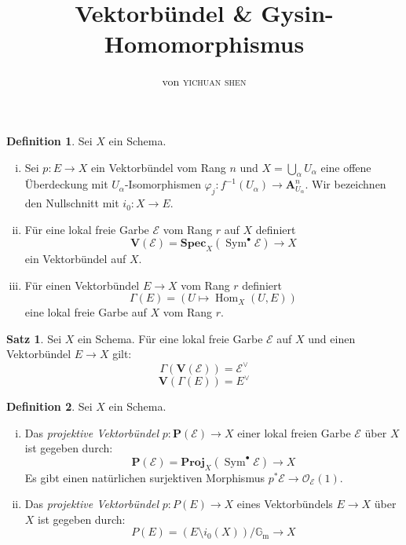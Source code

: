 \documentclass[10pt,a4paper]{article}
\author{von \textsc{yichuan shen}}
\title{Vektorbündel \& Gysin-Homomorphismus}
\begin{document}
\theoremstyle{plain}
\theoremstyle{definition}
\newtheorem{theorem}{Theorem}
\newtheorem{lemma}[theorem]{Lemma}
\newtheorem{proposition}[theorem]{Satz}
\newtheorem{corollary}[theorem]{Korollar}
\theoremstyle{definition}
\newtheorem*{definition}{Definition}
\newtheorem*{example}{Beispiel}
\theoremstyle{remark}
\newtheorem*{remark}{Bemerkung}

\maketitle

\begin{definition}
Sei $X$ ein Schema.
\begin{enumerate}[(i)]
\item Sei $p: E\to X$ ein Vektorbündel vom Rang $n$ und $X=\bigcup_\alpha U_\alpha$ eine offene Überdeckung mit $U_\alpha$-Isomorphismen $\varphi_j: f^{-1}(U_\alpha)\to \mathbf{A}_{U_\alpha}^n$. Wir bezeichnen den Nullschnitt mit $i_0: X\to E$.
\item Für eine lokal freie Garbe $\mathcal{E}$ vom Rang $r$ auf $X$ definiert
\[ \mathbf{V}(\mathcal{E}) = \mathbf{Spec}_X(\operatorname{Sym}^\bullet\mathcal{E})\to X \]
ein Vektorbündel auf $X$.
\item Für einen Vektorbündel $E\to X$ vom Rang $r$ definiert
\[ \Gamma(E) = (U\mapsto \operatorname{Hom}_X(U, E)) \]
eine lokal freie Garbe auf $X$ vom Rang $r$.
\end{enumerate}
\end{definition}

\begin{proposition}
Sei $X$ ein Schema. Für eine lokal freie Garbe $\mathcal{E}$ auf $X$ und einen Vektorbündel $E\to X$ gilt:
\[ \Gamma(\mathbf{V}(\mathcal{E})) = \mathcal{E}^\vee \]
\[ \mathbf{V}(\Gamma(E)) = E^\vee \]
\end{proposition}

\begin{definition}
Sei $X$ ein Schema.
\begin{enumerate}[(i)]
\item Das \textit{projektive Vektorbündel} $p: \mathbf{P}(\mathcal{E})\to X$ einer lokal freien Garbe $\mathcal{E}$ über $X$ ist gegeben durch:
\[ \mathbf{P}(\mathcal{E}) = \mathbf{Proj}_X(\operatorname{Sym}^\bullet\mathcal{E})\to X \]
Es gibt einen natürlichen surjektiven Morphismus $p^\ast\mathcal{E} \to \mathcal{O}_\mathcal{E}(1)$.
\item Das \textit{projektive Vektorbündel} $p: P(E)\to X$ eines Vektorbündels $E\to X$ über $X$ ist gegeben durch:
\[ P(E) = (E\setminus i_0(X))/\mathbb{G}_\text{m}\to X \]
\end{enumerate}
\end{definition}
\end{document}
